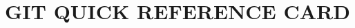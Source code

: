 \def\cmd#1{{\tt#1}\null}	%

\def\cmdS#1#2{
  \noindent
  \hbox to \hsize {%
    \vtop{
      \hbox to 2.4cm {
        \noindent\cmd{#1}\dotfill
      }
    }%
    \hfil	%
    \vtop{
      \hsize=5.90cm
      \hbox{\hfuzz = 15pt \vtop{
      {#2}
      }}
    }
  }
  \par
  \vskip 0.14cm
}

\def\cmdOpt#1#2{
  \noindent
  \hbox to \hsize {%
    \vtop{
      \hbox to 2.4cm {
      \hskip 24pt
      \noindent\cmd{\it-#1}
      }
    }%
    \hfil	%
    \vtop{
      \hsize=5.90cm
      \hbox{\hfuzz = 15pt \vtop{
      \it{#2}
      }}
    }
  }
  \par
  \vskip 0.14cm
}

\def\cmdL#1#2{
  \hsize=8.5cm
  \vbox {
    \hbox{
        \cmd{#1}\hfil
    }%
    \hskip 2.5cm  %
    \hbox to 5.9cm {%
      \hfuzz = 5pt
      \hfil
      \hsize=5.9cm
      \vtop{
        {#2}
        }}
  }%
  \par
  \vskip 0.14cm
}


\title{GIT QUICK REFERENCE CARD}

\shortcopyrightnotice


